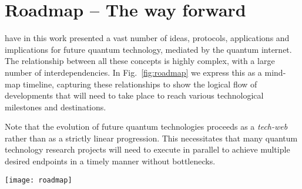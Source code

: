 %
%

\part{Roadmap -- The way forward}

 have in this work presented a vast number of ideas, protocols, applications and implications for future quantum technology, mediated by the quantum internet. The relationship between all these concepts is highly complex, with a large number of interdependencies. In Fig.~\ref{fig:roadmap} we express this as a mind-map timeline, capturing these relationships to show the logical flow of developments that will need to take place to reach various technological milestones and destinations.

Note that the evolution of future quantum technologies proceeds as a \textit{tech-web} rather than as a strictly linear progression. This necessitates that many quantum technology research projects will need to execute in parallel to achieve multiple desired endpoints in a timely manner without bottlenecks.

\begin{figure*}
	\texttt{[image: roadmap]}
	\caption{Relationships and dependencies in the development and deployment of the major concepts in the quantum internet -- the quantum \textit{tech-web} -- showing the logical flow of developments that will need to take place to reach various technological milestones and destinations. The progression is highly non-linear, mandating many research programs operating in parallel to prevent technology bottlenecks.}\label{fig:roadmap}
\end{figure*}
